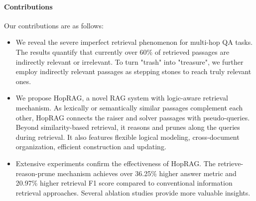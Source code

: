 \paragraph{Contributions}
Our contributions are as follows:
\begin{itemize}
\item We reveal the severe imperfect retrieval phenomenon for multi-hop QA tasks. The results quantify that currently over 60\% of retrieved passages are indirectly relevant or irrelevant. To turn "trash" into "treasure", we further employ indirectly relevant passages as stepping stones to reach truly relevant ones.
\item We propose HopRAG, a novel RAG system with logic-aware retrieval mechanism. As lexically or semantically similar passages complement each other, HopRAG connects the raiser and solver passages with pseudo-queries. Beyond similarity-based retrieval, it reasons and prunes along the queries during retrieval. It also features flexible logical modeling, cross-document organization, efficient construction and updating.
\item Extensive experiments confirm the effectiveness of HopRAG. The retrieve-reason-prune mechanism achieves over 36.25\% higher answer metric and 20.97\% higher retrieval F1 score compared to conventional information retrieval approaches. Several ablation studies provide more valuable insights.
\end{itemize}

 

